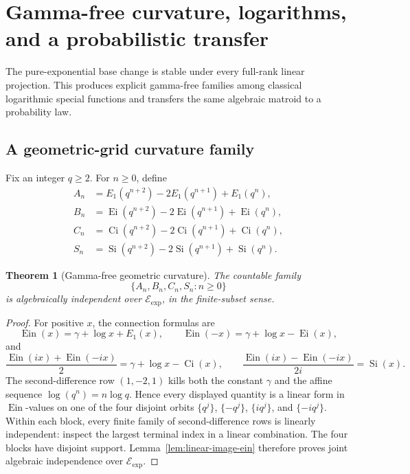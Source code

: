 \documentclass[11pt]{article}
\newtheorem{theorem}{Theorem}[section]
\theoremstyle{definition}
\theoremstyle{remark}
\newcommand{\Ein}{\operatorname{Ein}}
\newcommand{\Ei}{\operatorname{Ei}}
\newcommand{\Ci}{\operatorname{Ci}}
\newcommand{\Eexp}{\mathcal E_{\mathrm{exp}}}
\newcommand{\Si}{\operatorname{Si}}
\begin{document}
\section{Gamma-free curvature, logarithms, and a probabilistic transfer}
\label{sec:crossfield-transfers}

The pure-exponential base change is stable under every full-rank linear
projection.  This produces explicit gamma-free families among classical
logarithmic special functions and transfers the same algebraic matroid to a
probability law.

\subsection{A geometric-grid curvature family}

Fix an integer \(q\ge2\).  For \(n\ge0\), define
\begin{align*}
 A_n&=E_1(q^{n+2})-2E_1(q^{n+1})+E_1(q^n),\\
 B_n&=\Ei(q^{n+2})-2\Ei(q^{n+1})+\Ei(q^n),\\
 C_n&=\Ci(q^{n+2})-2\Ci(q^{n+1})+\Ci(q^n),\\
 S_n&=\Si(q^{n+2})-2\Si(q^{n+1})+\Si(q^n).
\end{align*}

\begin{theorem}[Gamma-free geometric curvature]
\label{thm:geometric-curvature}
The countable family
\begin{equation}\label{eq:geometric-curvature-family}
 \{A_n,B_n,C_n,S_n:n\ge0\}
\end{equation}
is algebraically independent over \(\Eexp\), in the finite-subset sense.
\end{theorem}

\begin{proof}
For positive \(x\), the connection formulas are
\[
 \Ein(x)=\gamma+\log x+E_1(x),\qquad
 \Ein(-x)=\gamma+\log x-\Ei(x),
\]
and
\[
 \frac{\Ein(ix)+\Ein(-ix)}2=\gamma+\log x-\Ci(x),
 \qquad
 \frac{\Ein(ix)-\Ein(-ix)}{2i}=\Si(x).
\]
The second-difference row \((1,-2,1)\) kills both the constant \(\gamma\)
and the affine sequence \(\log(q^n)=n\log q\).  Hence every displayed
quantity is a linear form in \(\Ein\)-values on one of the four disjoint
orbits \(\{q^j\}\), \(\{-q^j\}\), \(\{iq^j\}\), and \(\{-iq^j\}\).
Within each block, every finite family of second-difference rows is linearly
independent: inspect the largest terminal index in a linear combination.
The four blocks have disjoint support.  Lemma~\ref{lem:linear-image-ein}
therefore proves joint algebraic independence over \(\Eexp\).
\end{proof}
\end{document}
